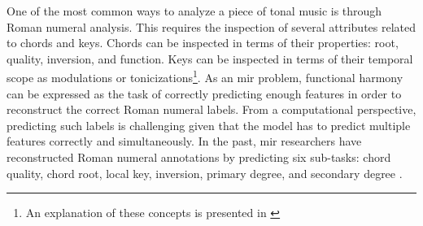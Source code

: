 

One of the most common ways to analyze a piece of tonal
music is through Roman numeral analysis. This requires the
inspection of several attributes related to chords and keys.
Chords can be inspected in terms of their properties: root,
quality, inversion, and function. Keys can be inspected in
terms of their temporal scope as modulations or
tonicizations\footnote{An explanation of these concepts is
presented in \textcite{napoleslopez2020local}}. As an \gls{mir}
problem, functional harmony can be expressed as the task of
correctly predicting enough features in order to reconstruct
the correct Roman numeral labels. From a computational
perspective, predicting such labels is challenging
given that the model has to predict multiple features
correctly and simultaneously. In the past, \gls{mir} researchers
have reconstructed Roman numeral annotations by predicting
six sub-tasks: chord quality, chord root, local key,
inversion, primary degree, and secondary degree
\parencite{chen2018functional, micchi2020not}.
